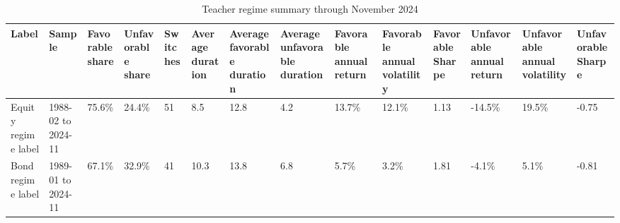 \begin{table}[!htbp]
\centering
\caption{Teacher regime summary through November 2024}
\small
\begin{tabular}{llllllllllllll}
\toprule
Label & Sample & Favorable share & Unfavorable share & Switches & Average duration & Average favorable duration & Average unfavorable duration & Favorable annual return & Favorable annual volatility & Favorable Sharpe & Unfavorable annual return & Unfavorable annual volatility & Unfavorable Sharpe \\
\midrule
Equity regime label & 1988-02 to 2024-11 & 75.6\% & 24.4\% & 51 & 8.5 & 12.8 & 4.2 & 13.7\% & 12.1\% & 1.13 & -14.5\% & 19.5\% & -0.75 \\
Bond regime label & 1989-01 to 2024-11 & 67.1\% & 32.9\% & 41 & 10.3 & 13.8 & 6.8 & 5.7\% & 3.2\% & 1.81 & -4.1\% & 5.1\% & -0.81 \\
\bottomrule
\end{tabular}
\end{table}